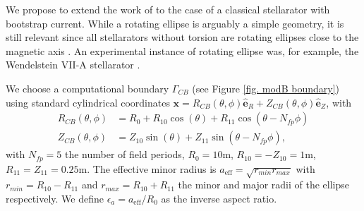 \documentclass[my_thesis.tex]{subfiles}
\begin{document}

We propose to extend the work of \citet{Loizu2017} to the case of a classical stellarator with bootstrap current. While a rotating ellipse is arguably a simple geometry, it is still relevant since all stellarators without torsion are rotating ellipses close to the magnetic axis \citep{helanderTheoryPlasmaConfinement2014}. An experimental instance of rotating ellipse was, for example, the Wendelstein VII-A stellarator \citep{Grieger1985}.

We choose a computational boundary $\Gamma_{CB}$  (see Figure \ref{fig. modB boundary}) using standard cylindrical coordinates $\mathbf{x}=R_{CB}(\theta,\phi)\mathbf{\hat{e}}_R +Z_{CB}(\theta,\phi)\mathbf{\hat{e}}_Z$, with
\begin{align}
	R_{CB}(\theta,\phi) &= R_0 + R_{10}\cos(\theta) + R_{11}\cos(\theta-N_{fp}\phi)\label{eq.cb_r}\\
	Z_{CB}(\theta,\phi) &= Z_{10}\sin(\theta) + Z_{11}\sin(\theta-N_{fp}\phi)\label{eq.cb_z},
\end{align}
with $N_{fp}=5$ the number of field periods, $R_0=10$m, $R_{10}=-Z_{10}=1$m, $R_{11}=Z_{11}=0.25$m. The effective minor radius is $a_{\text{eff}}=\sqrt{r_{min}r_{max}}$ with $r_{min}=R_{10}-R_{11}$ and $r_{max}=R_{10}+R_{11}$ the minor and major radii of the ellipse respectively. We define $\epsilon_a=a_{\text{eff}}/R_0$ as the inverse aspect ratio.
\end{document}
